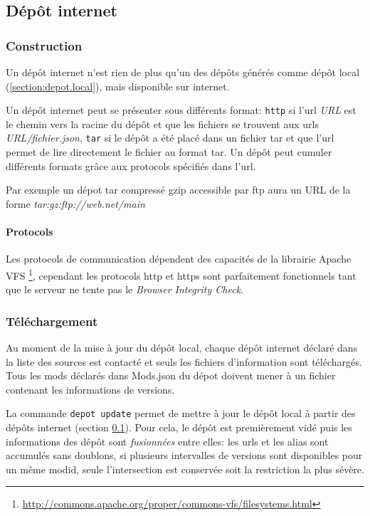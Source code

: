 \documentclass{article}
\begin{document}
\subsection{Dépôt internet}
\label{section:depot.internet}
\subsubsection{Construction}
Un dépôt internet n'est rien de plus qu'un des dépôts générés comme dépôt local (\ref{section:depot.local}), mais disponible sur internet.

Un dépôt internet peut se présenter sous différents format: \texttt{http} si l'url \textit{URL} est le chemin vers la racine du dépôt et que les fichiers se trouvent aux urls \textit{URL/fichier.json}, \texttt{tar} si le dépôt a été placé dans un fichier tar et que l'url permet de lire directement le fichier au format tar.
Un dépôt peut cumuler différents formats grâce aux protocols spécifiés dans l'url.

Par exemple un dépot tar compressé gzip accessible par ftp aura un URL de la forme \textit{tar:gz:ftp://web.net/main}

\paragraph{Protocols}
Les protocols de communication dépendent des capacités de la librairie Apache VFS \footnote{\url{http://commons.apache.org/proper/commons-vfs/filesystems.html}}, cependant les protocols http et https sont parfaitement fonctionnels tant que le serveur ne tente pas le \textit{Browser Integrity Check}.

\subsubsection{Téléchargement}
Au moment de la mise à jour du dépôt local, chaque dépôt internet déclaré dans la liste des sources est contacté et seuls les fichiers d'information sont téléchargés.
Tous les mods déclarés dans \textsf{Mods.json} du dépot doivent mener à un fichier contenant les informations de versions.

La commande \texttt{depot update} permet de mettre à jour le dépôt local à partir des dépôts internet (section \ref{section:depot.internet}).
Pour cela, le dépôt est premièrement vidé puis les informations des dépôt sont \textit{fusionnées} entre elles: les urls et les alias sont accumulés sans doublons, si plusieurs intervalles de versions sont disponibles pour un même modid, seule l'intersection est conservée soit la restriction la plus sévère.
\end{document}
